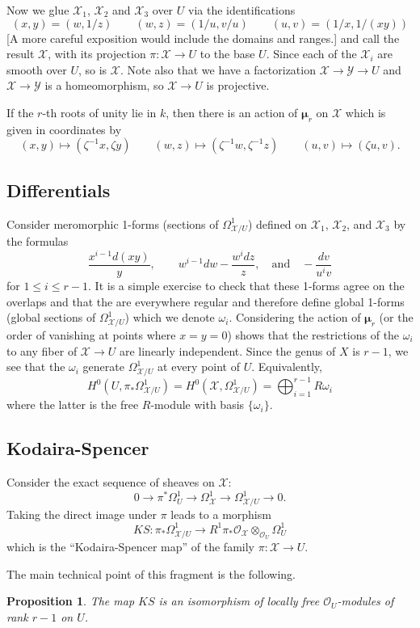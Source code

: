 \documentclass[reqno]{amsart}
\newtheorem{prop}[thm]{Proposition}
\theoremstyle{definition}
\theoremstyle{remark}
\def\bmu{{\boldsymbol\mu}}
\def\XX{\mathcal{X}}
\def\YY{\mathcal{Y}}
\def\O{\mathcal{O}}
\def\OO{\mathcal{O}}
\def\tensor{\otimes}
\begin{document}
Now we glue $\XX_1$, $\XX_2$ and $\XX_3$ over $U$ via the identifications
$$(x,y)=(w,1/z)\qquad(w,z)=(1/u,v/u)\qquad(u,v)=(1/x,1/(xy))$$
[A more careful exposition would include the domains and ranges.]
and call the result $\XX$, with its projection $\pi:\XX\to U$ to the base
$U$.   Since each of the $\XX_i$ are smooth over $U$, so is $\XX$.
Note also that we have a factorization $\XX\to\YY\to U$ and
$\XX\to\YY$ is a homeomorphism, so $\XX\to U$ is projective.

If the $r$-th roots of unity lie in $k$, then there is an
action of $\bmu_r$ on $\XX$ which is given in coordinates by
$$(x,y)\mapsto(\zeta^{-1} x,\zeta y)\qquad
(w,z)\mapsto(\zeta^{-1}w,\zeta^{-1}z)\qquad
(u,v)\mapsto(\zeta u,v).$$

\subsection{Differentials}
Consider meromorphic 1-forms (sections of $\Omega^1_{\XX/U}$) defined
on $\XX_1$, $\XX_2$, and $\XX_3$ by the formulas
$$\frac{x^{i-1}d(xy)}{y},\qquad
w^{i-1}dw-\frac{w^idz}{z},\quad\text{and}\quad-\frac{dv}{u^iv}$$ 
for $1\le i\le r-1$. It is a simple exercise to check that these
1-forms agree on the overlaps and that the are everywhere regular and
therefore define global 1-forms (global sections of
$\Omega^1_{\XX/U}$) which we denote $\omega_i$. Considering the action
of $\bmu_r$ (or the order of vanishing at points where $x=y=0$) shows
that the restrictions of the $\omega_i$ to any fiber of $\XX\to U$ are
linearly independent. Since the genus of $X$ is $r-1$, we see that the
$\omega_i$ generate $\Omega^1_{\XX/U}$ at every point of $U$.
Equivalently, 
$$H^0(U,\pi_*\Omega^1_{\XX/U})=
H^0(\XX,\Omega^1_{\XX/U})=\bigoplus_{i=1}^{r-1}R\omega_i$$ 
where the latter is the free $R$-module with basis $\{\omega_i\}$.

\subsection{Kodaira-Spencer}\label{s:KS}
Consider the exact sequence of sheaves on $\XX$:
$$0\to\pi^*\Omega^1_U\to\Omega^1_{\XX}\to\Omega^1_{\XX/U}\to 0.$$
Taking the direct image under $\pi$ leads to a morphism
$$KS:\pi_*\Omega^1_{\XX/U}\to R^1\pi_*\O_\XX\tensor_{\OO_U}\Omega^1_{U}$$
which is the ``Kodaira-Spencer map'' of the family $\pi:\XX\to U$.

The main technical point of this fragment is the following.

\begin{prop}\label{prop:KS}
The map $KS$ is an
isomorphism of locally free $\OO_U$-modules of rank $r-1$ on $U$.
\end{prop}
\end{document}
